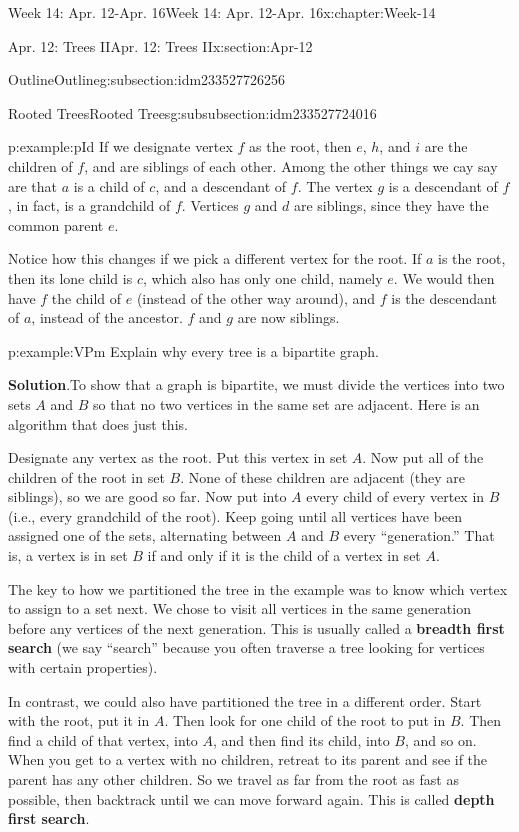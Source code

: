 \documentclass[oneside,10pt,]{book}
\newcommand{\blocktitlefont}{\relax}
\newcommand{\terminology}[1]{\textbf{#1}}
\numberwithin{equation}{section}
\begin{document}
\begin{chapterptx}{Week 14: Apr. 12-Apr. 16}{}{Week 14: Apr. 12-Apr. 16}{}{}{x:chapter:Week-14}
\begin{sectionptx}{Apr. 12: Trees II}{}{Apr. 12: Trees II}{}{}{x:section:Apr-12}
\begin{subsectionptx}{Outline}{}{Outline}{}{}{g:subsection:idm233527726256}
\begin{subsubsectionptx}{Rooted Trees}{}{Rooted Trees}{}{}{g:subsubsection:idm233527724016}
\begin{example}{}{p:example:pId}
If we designate vertex \(f\) as the root, then \(e\), \(h\), and \(i\) are the children of \(f\), and are siblings of each other.  Among the other things we cay say are that \(a\) is a child of \(c\), and a descendant of \(f\).  The vertex \(g\) is a descendant of \(f\), in fact, is a grandchild of \(f\).  Vertices \(g\) and \(d\) are siblings, since they have the common parent \(e\).%
\par
Notice how this changes if we pick a different vertex for the root.  If \(a\) is the root, then its lone child is \(c\), which also has only one child, namely \(e\).  We would then have \(f\) the child of \(e\) (instead of the other way around), and \(f\) is the descendant of \(a\), instead of the ancestor.  \(f\) and \(g\) are now siblings.%
\end{example}
\begin{example}{}{p:example:VPm}%
Explain why every tree is a bipartite graph.%
\par\smallskip%
\noindent\textbf{\blocktitlefont Solution}.\hypertarget{p:solution:rxq}{}\quad{}To show that a graph is bipartite, we must divide the vertices into two sets \(A\) and \(B\) so that no two vertices in the same set are adjacent.  Here is an algorithm that does just this.%
\par
Designate any vertex as the root.  Put this vertex in set \(A\).  Now put all of the children of the root in set \(B\).  None of these children are adjacent (they are siblings), so we are good so far.  Now put into \(A\) every child of every vertex in \(B\) (i.e., every grandchild of the root).  Keep going until all vertices have been assigned one of the sets, alternating between \(A\) and \(B\) every ``generation.''  That is, a vertex is in set \(B\) if and only if it is the child of a vertex in set \(A\).%
\end{example}
 The key to how we partitioned the tree in the example was to know which vertex to assign to a set next.  We chose to visit all vertices in the same generation before any vertices of the next generation.  This is usually called a \terminology{breadth first search} (we say ``search'' because you often traverse a tree looking for vertices with certain properties).%
\par
{} In contrast, we could also have partitioned the tree in a different order.  Start with the root, put it in \(A\).  Then look for one child of the root to put in \(B\).  Then find a child of that vertex, into \(A\), and then find its child, into \(B\), and so on.  When you get to a vertex with no children, retreat to its parent and see if the parent has any other children.  So we travel as far from the root as fast as possible, then backtrack until we can move forward again.  This is called \terminology{depth first search}.%

\end{subsubsectionptx}
\end{subsectionptx}
\end{sectionptx}
\end{chapterptx}
\end{document}
